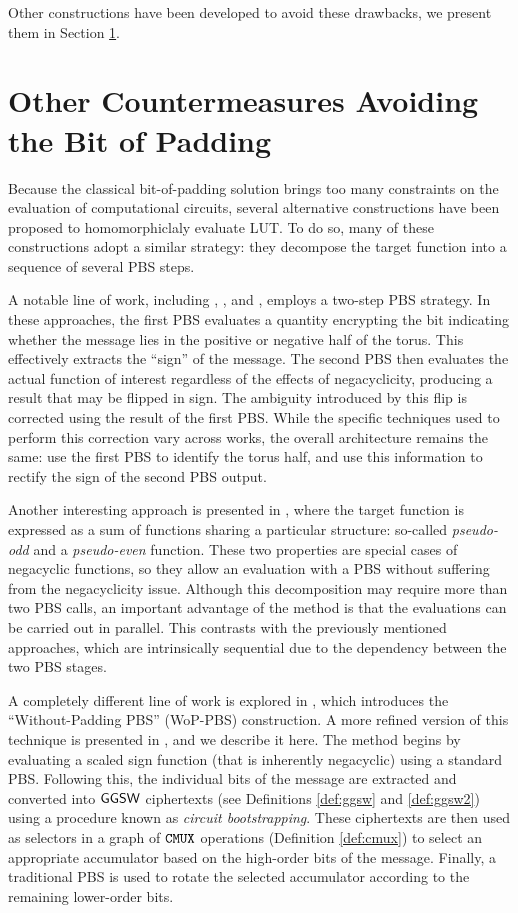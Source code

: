 Other constructions have been developed to avoid these drawbacks, we present them in Section \ref{sec:soa_padding_bit}.



\section{Other Countermeasures Avoiding the Bit of Padding}
\label{sec:soa_padding_bit}

Because the classical bit-of-padding solution brings too many constraints on the evaluation of computational circuits, several alternative constructions have been proposed to homomorphiclaly evaluate LUT. To do so, many of these constructions adopt a similar strategy: they decompose the target function into a sequence of several PBS steps. 

A notable line of work, including \cite{EPRINT:YXSCZ21}, \cite{AC:LiuMicPol22}, and \cite{TCHES:KluSch23}, employs a two-step PBS strategy. In these approaches, the first PBS evaluates a quantity  encrypting the bit indicating whether the message lies in the positive or negative half of the torus. This effectively extracts the ``sign'' of the message. The second PBS then evaluates the actual function of interest regardless of the effects of negacyclicity, producing a result that may be flipped in sign. The ambiguity introduced by this flip is corrected using the result of the first PBS. While the specific techniques used to perform this correction vary across works, the overall architecture remains the same: use the first PBS to identify the torus half, and use this information to rectify the sign of the second PBS output.

Another interesting approach is presented in \cite{AFRICACRYPT:CBSZ23}, where the target function is expressed as a sum of functions sharing a particular structure: so-called \textit{pseudo-odd} and a \textit{pseudo-even} function. These two properties are special cases of negacyclic functions, so they allow an evaluation with a PBS without suffering from the negacyclicity issue. Although this decomposition may require more than two PBS calls, an important advantage of the method is that the evaluations can be carried out in parallel. This contrasts with the previously mentioned approaches, which are intrinsically sequential due to the dependency between the two PBS stages.

A completely different line of work is explored in \cite{AC:CLOT21}, which introduces the “Without-Padding PBS” (WoP-PBS) construction. A more refined version of this technique is presented in \cite{JC:BBBCLO23}, and we describe it here. The method begins by evaluating a scaled sign function (that is inherently negacyclic) using a standard PBS. Following this, the individual bits of the message are extracted and converted into $\textsf{GGSW}$ ciphertexts (see Definitions \ref{def:ggsw} and \ref{def:ggsw2}) using a procedure known as \textit{circuit bootstrapping}. These ciphertexts are then used as selectors in a graph of $\texttt{CMUX}$ operations (Definition \ref{def:cmux}) to select an appropriate accumulator based on the high-order bits of the message. Finally, a traditional PBS is used to rotate the selected accumulator according to the remaining lower-order bits.

